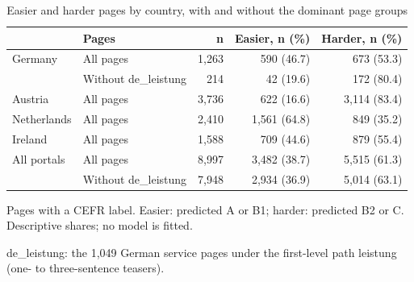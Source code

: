 \begin{table}[htbp]
\centering
\begin{threeparttable}
\caption{Easier and harder pages by country, with and without the dominant page groups}
\label{tab:easier-harder-groups}
\begin{tabular}{llrrr}
\hline
 & Pages & n & Easier, n (\%) & Harder, n (\%) \\
\hline
Germany & All pages & 1,263 & 590 (46.7) & 673 (53.3) \\
 & \quad Without de\_leistung & 214 & 42 (19.6) & 172 (80.4) \\
\hline
Austria & All pages & 3,736 & 622 (16.6) & 3,114 (83.4) \\
\hline
Netherlands & All pages & 2,410 & 1,561 (64.8) & 849 (35.2) \\
\hline
Ireland & All pages & 1,588 & 709 (44.6) & 879 (55.4) \\
\hline
All portals & All pages & 8,997 & 3,482 (38.7) & 5,515 (61.3) \\
 & \quad Without de\_leistung & 7,948 & 2,934 (36.9) & 5,014 (63.1) \\
\hline
\end{tabular}
\begin{tablenotes}
\footnotesize
\item Pages with a CEFR label. Easier: predicted A or B1; harder: predicted B2 or C. Descriptive shares; no model is fitted.
\item de\_leistung: the 1,049 German service pages under the first-level path leistung (one- to three-sentence teasers).
\end{tablenotes}
\end{threeparttable}
\end{table}
